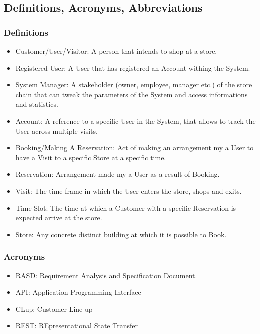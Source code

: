 \subsection{Definitions, Acronyms, Abbreviations}

\subsubsection{Definitions}
\begin{itemize}
    \item Customer/User/Visitor: A person that intends to shop at a store.
    \item Registered User: A User that has registered an Account withing the System.
    \item System Manager: A stakeholder (owner, employee, manager etc.) of the store chain that can tweak the parameters of the System and access informations and statistics.
    \item Account: A reference to a specific User in the System, that allows to track the User across multiple visits.
    \item Booking/Making A Reservation: Act of making an arrangement my a User to have a Visit to a specific Store at a specific time.
    \item Reservation: Arrangement made my a User as a result of Booking.
    \item Visit: The time frame in which the User enters the store, shops and exits.
    \item Time-Slot: The time at which a Customer with a specific Reservation is expected arrive at the store.
    \item Store: Any concrete distinct building at which it is possible to Book.
\end{itemize}

\subsubsection{Acronyms}
\begin{itemize}
    \item RASD: Requirement Analysis and Specification Document.
    \item API: Application Programming Interface
    \item CLup: Customer Line-up
    \item REST: REpresentational State Transfer
\end{itemize}


